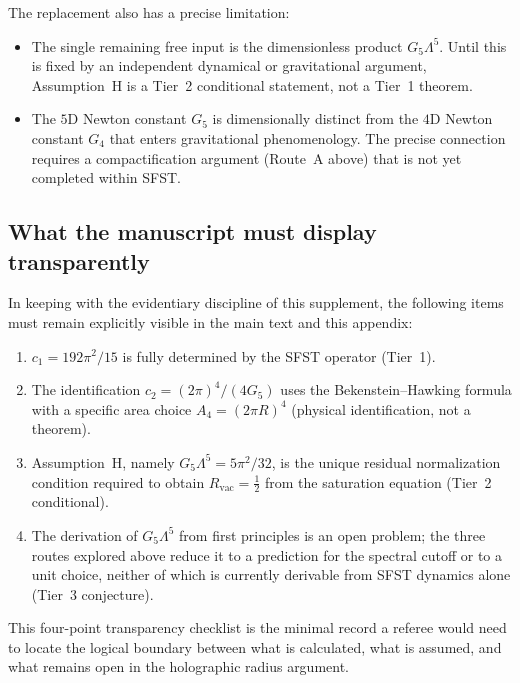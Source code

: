 The replacement also has a precise limitation:
\begin{itemize}[leftmargin=1.5em]
  \item The single remaining free input is the dimensionless product
        $G_5\Lambda^5$.  Until this is fixed by an independent
        dynamical or gravitational argument, Assumption~H is a
        Tier~2 conditional statement, not a Tier~1 theorem.
  \item The $5$D Newton constant $G_5$ is dimensionally distinct from
        the $4$D Newton constant $G_4$ that enters gravitational
        phenomenology.  The precise connection requires a
        compactification argument (Route~A above) that is not yet
        completed within SFST.
\end{itemize}

\subsection{What the manuscript must display transparently}
\label{ssec:transparency}

In keeping with the evidentiary discipline of this supplement, the
following items must remain explicitly visible in the main text and
this appendix:

\begin{enumerate}[label=(\roman*)]
  \item $c_1 = 192\pi^2/15$ is fully determined by the SFST operator
        (Tier~1).
  \item The identification $c_2 = (2\pi)^4/(4G_5)$ uses the
        Bekenstein--Hawking formula with a specific area choice
        $A_4=(2\pi R)^4$ (physical identification, not a theorem).
  \item Assumption~H, namely $G_5\Lambda^5=5\pi^2/32$, is the unique
        residual normalization condition required to obtain
        $R_{\mathrm{vac}}=\tfrac{1}{2}$ from the saturation equation
        (Tier~2 conditional).
  \item The derivation of $G_5\Lambda^5$ from first principles is an
        open problem; the three routes explored above reduce it to a
        prediction for the spectral cutoff or to a unit choice,
        neither of which is currently derivable from SFST dynamics
        alone (Tier~3 conjecture).
\end{enumerate}

This four-point transparency checklist is the minimal record a referee
would need to locate the logical boundary between what is calculated,
what is assumed, and what remains open in the holographic radius
argument.
